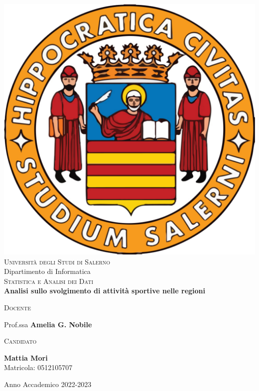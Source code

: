\begin{titlepage}
\changepage{}{}{}{}{}{}{}{}{}


\begin{center}
\includegraphics [width=.15\columnwidth, angle=0]{capitoli/images/unisa.pdf}\\ %
\vspace{0.5cm}
{\LARGE \scshape Università degli Studi di Salerno}\\
\vspace{1cm}
{\Large Dipartimento di Informatica}\\
\vspace{2cm}
{\Large \scshape Statistica e Analisi dei Dati} \\
\vspace{2cm}
{\huge \bfseries Analisi sullo svolgimento di attività sportive nelle regioni} \\
\vspace{6cm}

\begin{minipage}[t]{7cm}
\flushleft
\textsc{Docente}

Prof.ssa \textbf{Amelia G. Nobile} \\[0.25cm]

\end{minipage}
\hfill
\begin{minipage}[t]{7cm}
\flushright
\textsc{Candidato}

\textbf{Mattia Mori} \\
Matricola: 0512105707
\end{minipage}

\vspace{2cm}

{\small Anno Accademico 2022-2023} %

\end{center}

\end{titlepage}